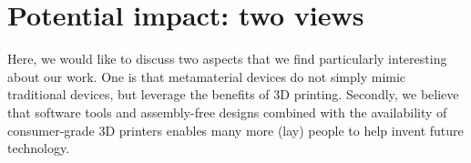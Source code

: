 






\section{Potential impact: two views}
Here, we would like to discuss two aspects that we find particularly interesting about our work. One is that metamaterial devices do not simply mimic traditional devices, but leverage the benefits of 3D printing. Secondly, we believe that software tools and assembly-free designs combined with the availability of consumer-grade 3D printers enables many more (lay) people to help invent future technology. 

